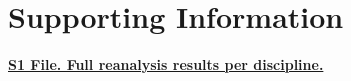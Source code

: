 \section*{Supporting Information}

\href{https://github.com/chartgerink/2015head/tree/master/submission}{\textbf{S1 File. Full reanalysis results per discipline.}}


  